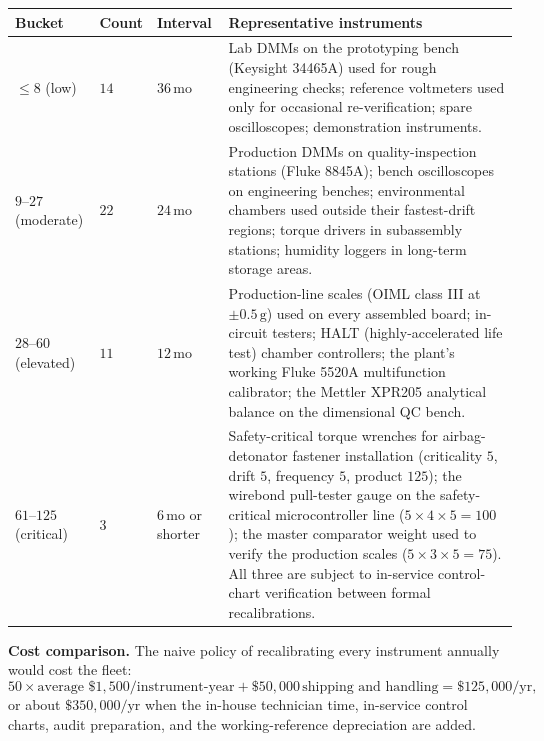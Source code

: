 \begin{center}
\small
\begin{tabular}{p{2.5cm}p{1.5cm}p{1.0cm}p{7.5cm}}
\toprule
Bucket & Count & Interval & Representative instruments \\
\midrule
$\leq 8$ (low)
  & $14$
  & $36$\,mo
  & Lab DMMs on the prototyping bench (Keysight 34465A) used for
    rough engineering checks; reference voltmeters used only for
    occasional re-verification; spare oscilloscopes; demonstration
    instruments. \\
\addlinespace
$9$--$27$ (moderate)
  & $22$
  & $24$\,mo
  & Production DMMs on quality-inspection stations (Fluke 8845A);
    bench oscilloscopes on engineering benches; environmental
    chambers used outside their fastest-drift regions; torque
    drivers in subassembly stations; humidity loggers in long-term
    storage areas. \\
\addlinespace
$28$--$60$ (elevated)
  & $11$
  & $12$\,mo
  & Production-line scales (OIML class III at $\pm 0.5\,\si{\gram}$)
    used on every assembled board; in-circuit testers; HALT
    (highly-accelerated life test) chamber controllers; the
    plant's working Fluke 5520A multifunction calibrator; the
    Mettler XPR205 analytical balance \cite{web:ch03t3b-mettler-xpr}
    on the dimensional QC bench. \\
\addlinespace
$61$--$125$ (critical)
  & $3$
  & $6$\,mo or shorter
  & Safety-critical torque wrenches for airbag-detonator fastener
    installation (criticality $5$, drift $5$, frequency $5$,
    product $125$); the wirebond pull-tester gauge on the
    safety-critical microcontroller line ($5 \times 4 \times 5 =
    100$); the master comparator weight used to verify the
    production scales ($5 \times 3 \times 5 = 75$). All three
    are subject to in-service control-chart verification between
    formal recalibrations. \\
\bottomrule
\end{tabular}
\end{center}

\textbf{Cost comparison.} The naive policy of recalibrating
every instrument annually would cost the fleet:
\[
50 \times \text{average } \$1{,}500/\text{instrument-year} +
\$50{,}000\,\text{shipping and handling} = \$125{,}000/\text{yr},
\]
or about $\$350{,}000/\text{yr}$ when the in-house technician
time, in-service control charts, audit preparation, and the
working-reference depreciation are added.

